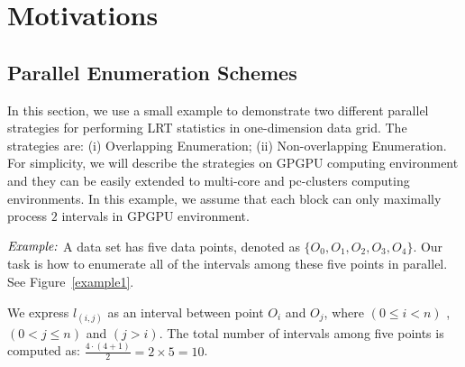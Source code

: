 \documentclass[AMA,LATO1COL]{WileyNJD-v2-bak}
\begin{document}
\section{Motivations}
\label{sec:mov}

\subsection{Parallel Enumeration Schemes}
\label{sec:mov1}
In this section, we use a small example to demonstrate two different parallel strategies for performing LRT statistics in one-dimension data grid. The strategies are: (i) Overlapping Enumeration; (ii) Non-overlapping Enumeration. For simplicity, we will describe the strategies on GPGPU computing environment and they can be easily extended to multi-core and pc-clusters computing environments. In this example, we assume that each block can only maximally process $2$ intervals in GPGPU environment.

$\noindent \textit {Example:}$  A data set has five data points, denoted as $\{O_0,O_1,O_2,O_3,O_4\}$. Our task is how to enumerate all of the intervals among these five points in parallel. See Figure~\ref{example1}.

 We express $l_{(i,j)}$ as an interval between point $O_i$ and $O_j$, where $ (0 \leq i<n) $ , $(0<j \leq n) $ and $(j > i)$.  The total number of intervals among five points is computed as: ${\frac{4 \cdot (4+1)}{2}}=2\times 5=10$.
\end{document}
